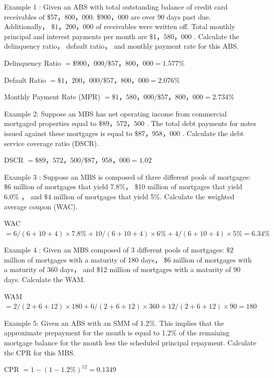 Example 1 : Given an ABS with total outstanding balance of credit card receivables of \$57，800，000. \$900，000 are over 90 days past due. Additionally， \(\$ 1，{200}，{000}\) of receivables were written off. Total monthly principal and interest payments per month are \(\$ 1，{580}，{000}\) . Calculate the delinquency ratio， default ratio， and monthly payment rate for this ABS.

Delinquency Ratio \(= \$ {900}，{000}/\$ {57}，{800}，{000} = {1.577}\%\)

Default Ratio \(= \$ 1，{200}，{000}/\$ {57}，{800}，{000} = {2.076}\%\)

Monthly Payment Rate (MPR) \(= \$ 1，{580}，{000}/\$ {57}，{800}，{000} = {2.734}\%\)

Example 2: Suppose an MBS has net operating income from commercial mortgaged properties equal to \(\$ {89}，{572}，{500}\) . The total debt payments for notes issued against these mortgages is equal to \(\$ {87}，{958}，{000}\) . Calculate the debt service coverage ratio (DSCR).

DSCR \(= \$ {89}，{572}，{500}/\$ {87}，{958}，{000} = {1.02}\)

Example 3 : Suppose an MBS is composed of three different pools of mortgages: \(\$ 6\) million of mortgages that yield 7.8\%， \$10 million of mortgages that yield \({6.0}\%\) ， and \(\$ 4\) million of mortgages that yield 5\%. Calculate the weighted average coupon (WAC).

WAC \(= 6/\left( {6 + {10} + 4}\right)  \times  {7.8}\%  + {10}/\left( {6 + {10} + 4}\right)  \times  6\%  + 4/\left( {6 + {10} + 4}\right)  \times  5\%  = {6.34}\%\)

Example 4 : Given an MBS composed of 3 different pools of mortgages: \(\$ 2\) million of mortgages with a maturity of 180 days， \$6 million of mortgages with a maturity of 360 days， and \$12 million of mortgages with a maturity of 90 days. Calculate the WAM.

WAM \(= 2/\left( {2 + 6 + {12}}\right)  \times  {180} + 6/\left( {2 + 6 + {12}}\right)  \times  {360} + {12}/\left( {2 + 6 + {12}}\right)  \times  {90} = {180}\)

 Example 5: Given an ABS with an SMM of 1.2\%. This implies that the approximate prepayment for the month is equal to 1.2\% of the remaining mortgage balance for the month less the scheduled principal repayment. Calculate the CPR for this MBS.

CPR \(= 1 - {\left( 1 - {1.2}\% \right) }^{12} = {0.1349}\)


